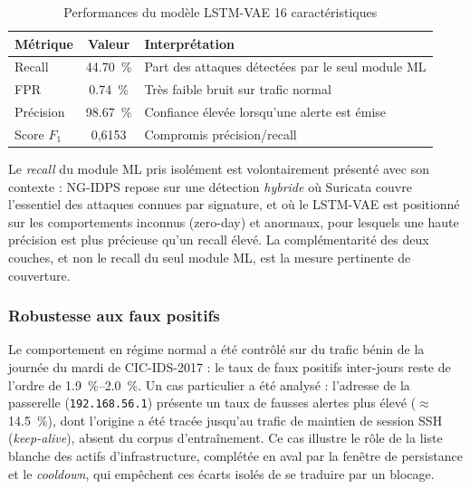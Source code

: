 \begin{table}[H]
\centering
\caption{Performances du modèle LSTM-VAE 16 caractéristiques}
\label{tab:resultats-modele}
\small
\begin{tabular}{@{}lcl@{}}
\toprule
\textbf{Métrique} & \textbf{Valeur} & \textbf{Interprétation} \\
\midrule
Recall & \SI{44.70}{\percent} & Part des attaques détectées par le seul module ML \\
FPR & \SI{0.74}{\percent} & Très faible bruit sur trafic normal \\
Précision & \SI{98.67}{\percent} & Confiance élevée lorsqu'une alerte est émise \\
Score $F_1$ & 0{,}6153 & Compromis précision/recall \\
\bottomrule
\end{tabular}
\end{table}


Le \emph{recall} du module ML pris isolément est volontairement présenté avec son contexte : NG-IDPS repose sur une détection \emph{hybride} où Suricata couvre l'essentiel des attaques connues par signature, et où le LSTM-VAE est positionné sur les comportements inconnus (zero-day) et anormaux, pour lesquels une haute précision est plus précieuse qu'un recall élevé. La complémentarité des deux couches, et non le recall du seul module ML, est la mesure pertinente de couverture.



\subsubsection{Robustesse aux faux positifs}

Le comportement en régime normal a été contrôlé sur du trafic bénin de la journée du mardi de CIC-IDS-2017 : le taux de faux positifs inter-jours reste de l'ordre de \SIrange{1.9}{2.0}{\percent}. Un cas particulier a été analysé : l'adresse de la passerelle (\texttt{192.168.56.1}) présente un taux de fausses alertes plus élevé ($\approx$\SI{14.5}{\percent}), dont l'origine a été tracée jusqu'au trafic de maintien de session SSH (\emph{keep-alive}), absent du corpus d'entraînement. Ce cas illustre le rôle de la liste blanche des actifs d'infrastructure, complétée en aval par la fenêtre de persistance et le \emph{cooldown}, qui empêchent ces écarts isolés de se traduire par un blocage.

